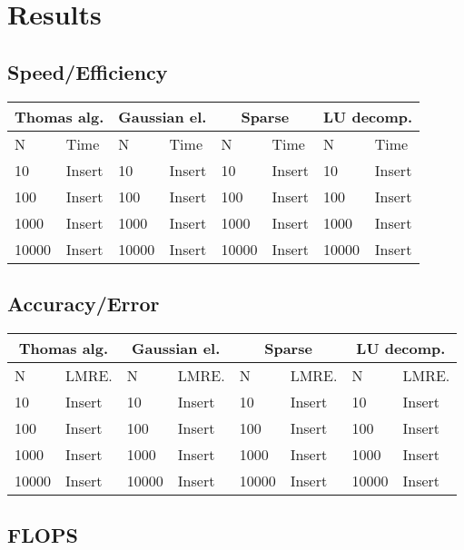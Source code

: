 \documentclass[11pt,a4paper,english,final]{article}
\numberwithin{equation}{section}
\begin{document}
\section{Results}

\subsection{Speed/Efficiency}

\begin{tabular}{|l|l|l|l|l|l|l|l|}
\hline
\multicolumn{2}{|c|}{Thomas alg.} & \multicolumn{2}{|c|}{Gaussian el.} & \multicolumn{2}{|c|}{Sparse} & \multicolumn{2}{|c|}{LU decomp.} \\
\hline
N & Time & N & Time & N & Time & N & Time  \\
\hline
10 & Insert & 10 & Insert & 10 & Insert &  10 & Insert \\
100 & Insert & 100 & Insert & 100 & Insert & 100 & Insert \\
1000 & Insert & 1000 & Insert & 1000 & Insert & 1000 & Insert \\
10000 & Insert & 10000 & Insert & 10000 & Insert & 10000 & Insert \\
\hline
\end{tabular}

\subsection{Accuracy/Error}

\begin{tabular}{|l|l|l|l|l|l|l|l|}
\hline
\multicolumn{2}{|c|}{Thomas alg.} & \multicolumn{2}{|c|}{Gaussian el.} & \multicolumn{2}{|c|}{Sparse} & \multicolumn{2}{|c|}{LU decomp.} \\
\hline
N & LMRE. & N & LMRE. & N & LMRE. & N & LMRE.  \\
\hline
10 & Insert & 10 & Insert & 10 & Insert &  10 & Insert \\
100 & Insert & 100 & Insert & 100 & Insert & 100 & Insert \\
1000 & Insert & 1000 & Insert & 1000 & Insert & 1000 & Insert \\
10000 & Insert & 10000 & Insert & 10000 & Insert & 10000 & Insert \\
\hline
\end{tabular}


\subsection{FLOPS}
\end{document}
